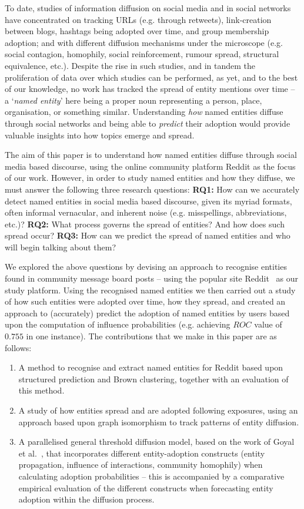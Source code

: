 \documentclass[sigconf]{acmart}
\begin{document}
To date, studies of information diffusion on social media and in social networks have concentrated on tracking URLs (e.g. through retweets), link-creation between blogs, hashtags being adopted over time, and group membership adoption; and with different diffusion mechanisms under the microscope (e.g. social contagion, homophily, social reinforcement, rumour spread, structural equivalence, etc.).
Despite the rise in such studies, and in tandem the proliferation of data over which studies can be performed, as yet, and to the best of our knowledge, no work has tracked the spread of entity mentions over time -- a `\emph{named entity}' here being a proper noun representing a person, place, organisation, or something similar.
Understanding \emph{how} named entities diffuse through social networks and being able to \emph{predict} their adoption would provide valuable insights into how topics emerge and spread.

The aim of this paper is to understand how named entities diffuse through social media based discourse, using the online community platform Reddit as the focus of our work.
However, in order to study named entities and how they diffuse, we must answer the following three research questions: \textbf{RQ1:} How can we accurately detect named entities in social media based discourse, given its myriad formats, often informal vernacular, and inherent noise (e.g. misspellings, abbreviations, etc.)? \textbf{RQ2:} What process governs the spread of entities? And how does such spread occur? \textbf{RQ3:} How can we predict the spread of named entities and who will begin talking about them?	

We explored the above questions by devising an approach to recognise entities found in community message board posts -- using the popular site Reddit~\cite{duggan20136} as our study platform.
Using the recognised named entities we then carried out a study of how such entities were adopted over time, how they spread, and created an approach to (accurately) predict the adoption of named entities by users based upon the computation of influence probabilities (e.g. achieving $ROC$ value of $0.755$ in one instance).
The contributions that we make in this paper are as follows:

\begin{enumerate}
	\item A method to recognise and extract named entities for Reddit based upon structured prediction and Brown clustering, together with an evaluation of this method.
	\item A study of how entities spread and are adopted following exposures, using an approach based upon graph isomorphism to track patterns of entity diffusion.
	\item A parallelised general threshold diffusion model, based on the work of Goyal et al.~\cite{goyal2010learning}, that incorporates different entity-adoption constructs (entity propagation, influence of interactions, community homophily) when calculating adoption probabilities -- this is accompanied by a comparative empirical evaluation of the different constructs when forecasting entity adoption within the diffusion process.
\end{enumerate}
\end{document}

